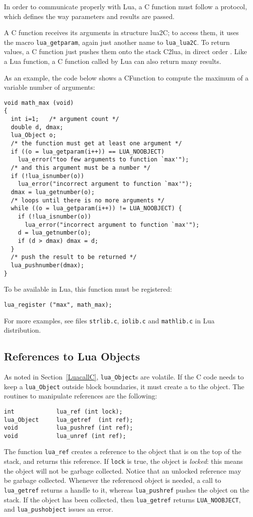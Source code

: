 In order to communicate properly with Lua,
a C function must follow a protocol,
which defines the way parameters and results are passed.

A C function receives its arguments in structure lua2C;
to access them, it uses the macro \verb|lua_getparam|, 
again just another name to \verb|lua_lua2C|.
To return values, a C function just pushes them onto the stack C2lua,
in direct order .
Like a Lua function, a C function called by Lua can also return
many results.

As an example,
the code below shows a CFunction to compute the maximum of
a variable number of arguments:
\begin{verbatim}
void math_max (void)
{
  int i=1;   /* argument count */
  double d, dmax;
  lua_Object o;
  /* the function must get at least one argument */
  if ((o = lua_getparam(i++)) == LUA_NOOBJECT)
    lua_error("too few arguments to function `max'");
  /* and this argument must be a number */
  if (!lua_isnumber(o))
    lua_error("incorrect argument to function `max'");
  dmax = lua_getnumber(o);
  /* loops until there is no more arguments */
  while ((o = lua_getparam(i++)) != LUA_NOOBJECT) {
    if (!lua_isnumber(o))
      lua_error("incorrect argument to function `max'");
    d = lua_getnumber(o);
    if (d > dmax) dmax = d;
  }
  /* push the result to be returned */
  lua_pushnumber(dmax);
}
\end{verbatim}
To be available in Lua, this function must be registered:
\begin{verbatim}
lua_register ("max", math_max);
\end{verbatim}

For more examples, see files \verb|strlib.c|,
\verb|iolib.c| and \verb|mathlib.c| in Lua distribution.

\subsection{References to Lua Objects}

As noted in Section~\ref{LuacallC}, \verb'lua_Object's are volatile.
If the C code needs to keep a \verb'lua_Object'
outside block boundaries,
it must create a  to the object.
The routines to manipulate references are the following:
\begin{verbatim}
int            lua_ref (int lock);
lua_Object     lua_getref  (int ref);
void           lua_pushref (int ref);
void           lua_unref (int ref);
\end{verbatim}
The function \verb'lua_ref' creates a reference
to the object that is on the top of the stack,
and returns this reference.
If \verb'lock' is true, the object is {\em locked\/}:
this means the object will not be garbage collected.
Notice that an unlocked reference may be garbage collected.
Whenever the referenced object is needed,
a call to \verb'lua_getref'
returns a handle to it,
whereas \verb'lua_pushref' pushes the object on the stack.
If the object has been collected,
then \verb'lua_getref' returns \verb'LUA_NOOBJECT',
and \verb'lua_pushobject' issues an error.

